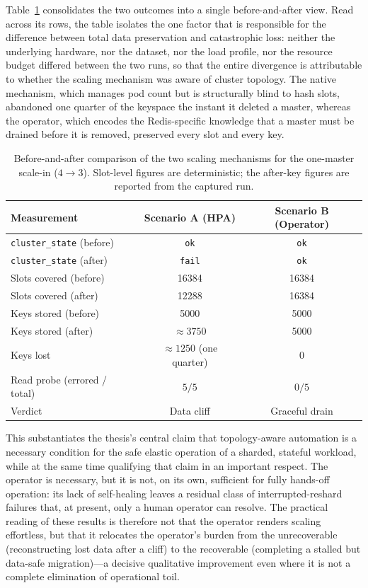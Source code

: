 Table~\ref{tab:results-comparison} consolidates the two outcomes into a single before-and-after
view. Read across its rows, the table isolates the one factor that is responsible for the
difference between total data preservation and catastrophic loss: neither the underlying
hardware, nor the dataset, nor the load profile, nor the resource budget differed between the
two runs, so that the entire divergence is attributable to whether the scaling mechanism was
aware of cluster topology. The native mechanism, which manages pod count but is structurally
blind to hash slots, abandoned one quarter of the keyspace the instant it deleted a master,
whereas the operator, which encodes the Redis-specific knowledge that a master must be drained
before it is removed, preserved every slot and every key.

\begin{table}[ht]
\centering
\caption{Before-and-after comparison of the two scaling mechanisms for the one-master scale-in
($4 \rightarrow 3$). Slot-level figures are deterministic; the after-key figures are reported
from the captured run.}
\label{tab:results-comparison}
\begin{tabular}{l c c}
\hline
\textbf{Measurement} & \textbf{Scenario A (HPA)} & \textbf{Scenario B (Operator)} \\
\hline
\texttt{cluster\_state} (before) & \texttt{ok}   & \texttt{ok}   \\
\texttt{cluster\_state} (after)  & \texttt{fail} & \texttt{ok}   \\
Slots covered (before)           & \num{16384}   & \num{16384}   \\
Slots covered (after)            & \num{12288}   & \num{16384}   \\
Keys stored (before)             & \num{5000}    & \num{5000}    \\
Keys stored (after)              & $\approx \num{3750}$ & \num{5000} \\
Keys lost                        & $\approx \num{1250}$ (one quarter) & \num{0} \\
Read probe (errored / total)     & $5 / 5$       & $0 / 5$       \\
Verdict                          & Data cliff    & Graceful drain \\
\hline
\end{tabular}
\end{table}

This substantiates the thesis's central claim that topology-aware automation is a necessary
condition for the safe elastic operation of a sharded, stateful workload, while at the same
time qualifying that claim in an important respect. The operator is necessary, but it is not,
on its own, sufficient for fully hands-off operation: its lack of self-healing leaves a
residual class of interrupted-reshard failures that, at present, only a human operator can
resolve. The practical reading of these results is therefore not that the operator renders
scaling effortless, but that it relocates the operator's burden from the unrecoverable
(reconstructing lost data after a cliff) to the recoverable (completing a stalled but
data-safe migration)---a decisive qualitative improvement even where it is not a complete
elimination of operational toil.

